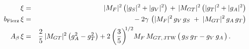 %
%
%
\begin{eqnarray}
\xi &=& 
	|M_F|^2    \left( |g_S|^2 + |g_V|^2 \right) \,+\, 
	|M_{GT}|^2 \left( |g_T|^2 + |g_A|^2 \right)
	\label{eq:jtw_xi_integrated_LH} 
	\\
\bFierz \, \xi &=& 
	- \: 2 \gamma \,
	\left( |M_F|^2 \, g_V \,g_S  \;+\; |M_{GT}|^2 \, g_A \, g_T \right) 
	\label{eq:jtw_bxi_integrated_LH} 
	\\
\Abeta \, \xi &=& 
	\frac{2}{5} \, |M_{GT}|^2 \left( g_A^2 - g_T^2 \right) + 
	2 \left( \frac{3}{5} \right)^{\!\! 1/2} \!
	M_F\,M_{GT, \textrm{\,JTW}} \left(\, g_S \, g_T - g_V \, g_A \phantom{g_A^2 \!\!\!\! \!\! } \right).
	\;\;\;\; \;\;\;\;
	\label{eq:jtw_Abetaxi_integrated_LH}
\end{eqnarray}
%